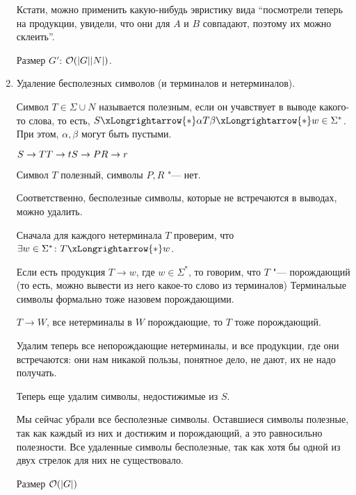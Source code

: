\begin{enumerate}
\begin{exmp}
Кстати, можно применить какую-нибудь эвристику вида ``посмотрели теперь на продукции, увидели, что они для $A$ и $B$ совпадают, поэтому их можно склеить''.
\end{exmp}

Размер $G'$: $\mathcal{O}(|G| |N|)$.

\item
Удаление бесполезных символов (и терминалов и нетерминалов).

Символ $T \in \Sigma \cup N$ называется полезным, если он учавствует в выводе какого-то слова, то есть, $S \xLongrightarrow{*} \alpha T \beta \xLongrightarrow{*} w \in \Sigma^*$. 
При этом, $\alpha, \beta$ могут быть пустыми.
\begin{exmp}
$ \\
S \to T \\
T \to t \\
S \to P \\
R \to r$

Символ $T$ полезный, символы $P, R$ "--- нет.
\end{exmp}
Соответственно, бесполезные символы, которые не встречаются в выводах, можно удалить.

Сначала для каждого нетерминала $T$ проверим, что $\exists w \in \Sigma^*\colon T \xLongrightarrow{*} w$.

Если есть продукция $T \to w$, где $w \in \Sigma^*$, то говорим, что $T$ "--- порождающий (то есть, можно вывести из него какое-то слово из терминалов)
Терминальые символы формально тоже назовем порождающими.

$T \to W$, все нетерминалы в $W$ порождающие, то $T$ тоже порождающий.                                              

Удалим теперь все непорождающие нетерминалы, и все продукции, где они встречаются: они нам никакой пользы, понятное дело, не дают, их не надо получать.

Теперь еще удалим символы, недостижимые из $S$.

Мы сейчас убрали все бесполезные символы. 
Оставшиеся символы полезные, так как каждый из них и достижим и порождающий, а это равносильно полезности.
Все удаленные символы бесполезные, так как хотя бы одной из двух стрелок для них не существовало.

Размер $\mathcal{O}(|G|)$
\end{enumerate}

